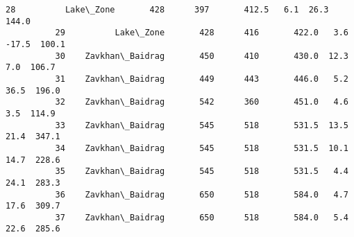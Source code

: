 \documentclass[11pt]{article}
\begin{document}
\begin{Verbatim}[commandchars=\\\{\}]
          28          Lake\_Zone       428      397       412.5   6.1  26.3  144.0   
          29          Lake\_Zone       428      416       422.0   3.6 -17.5  100.1   
          30    Zavkhan\_Baidrag       450      410       430.0  12.3   7.0  106.7   
          31    Zavkhan\_Baidrag       449      443       446.0   5.2  36.5  196.0   
          32    Zavkhan\_Baidrag       542      360       451.0   4.6   3.5  114.9   
          33    Zavkhan\_Baidrag       545      518       531.5  13.5  21.4  347.1   
          34    Zavkhan\_Baidrag       545      518       531.5  10.1  14.7  228.6   
          35    Zavkhan\_Baidrag       545      518       531.5   4.4  24.1  283.3   
          36    Zavkhan\_Baidrag       650      518       584.0   4.7  17.6  309.7   
          37    Zavkhan\_Baidrag       650      518       584.0   5.4  22.6  285.6   
          

\end{Verbatim}
\end{document}

